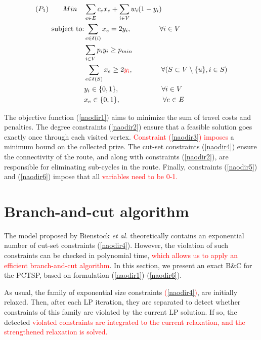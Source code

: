 \documentclass{ro}
\begin{document}
	\begin{align}
(P_1) \qquad	Min \quad  & \sum_{e \in E} c_e x_e + \sum_{i \in V} w_i (1 - y_i)  \label{naodir1}\\
	\text{subject to:}
	&\sum_{e \in \delta(i)} x_e = 2 y_i,  \qquad \qquad \forall i \in V\label{naodir2}\\
	&\sum_{i \in V}p_iy_i \geq p_{min} \label{naodir3}\\
	&\sum_{e \in \delta(S)} x_e \geq 2 \textcolor{red}{y_i}, \qquad  \qquad \forall (S \subset V \setminus \{u\}, i \in S) \label{naodir4}\\
	&y_i \in \{0,1\}, \qquad \qquad \qquad \forall i \in V \label{naodir5}\\
	&x_e \in \{0,1\}, \qquad \qquad \qquad \forall e \in E \label{naodir6} 
	\end{align}

The objective function (\ref{naodir1}) aims to minimize the sum of travel costs and penalties. The degree constraints (\ref{naodir2}) ensure that a
feasible solution goes exactly once through each visited vertex. \textcolor{red}{Constraint (\ref{naodir3}) imposes} a minimum bound on the collected prize. The cut-set constraints (\ref{naodir4}) ensure the connectivity of the route, and along with constraints (\ref{naodir2}), are responsible for eliminating sub-cycles in the route. Finally, constraints (\ref{naodir5}) and (\ref{naodir6}) impose that all \textcolor{red}{variables need to be 0-1.}



\section{Branch-and-cut algorithm}
\label{sec:bc}


The model proposed by Bienstock \textit{et al.} \cite{bienstock1993note} theoretically contains an exponential number of cut-set constraints (\ref{naodir4}). However, the violation of such constraints can be checked in polynomial time, \textcolor{red}{ which allows us to apply an efficient branch-and-cut algorithm}. In this section, we present an  exact B\&C for the PCTSP, based on formulation (\ref{naodir1})-(\ref{naodir6}).

As usual, the family of exponential size constraints \textcolor{red}{(\ref{naodir4})}, are initially
relaxed. Then, after each LP iteration, they are separated
to detect whether constraints of this family are
violated by the current LP solution. If so, the detected \textcolor{red}{
violated constraints are integrated to the current relaxation, and the strengthened relaxation is solved.
}
\end{document}
